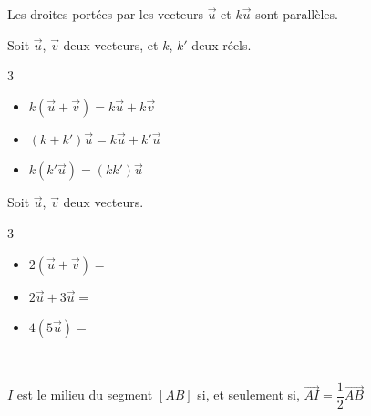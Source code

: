 \begin{Remarque}
Les droites portées par les vecteurs $\overrightarrow{u}$ et $k\overrightarrow{u}$ sont parallèles.
\end{Remarque}



\begin{Propriété}
Soit $\overrightarrow{u}$, $\overrightarrow{v}$ deux vecteurs, et $k$, $k'$ deux réels.
\vspace{-0.5cm}
\begin{multicols}{3}
\begin{itemize}[label=\textcolor{Couleur2}{$\bullet$}]
\item $k(\overrightarrow{u}+\overrightarrow{v})=k\overrightarrow{u}+k\overrightarrow{v}$
\item $(k+k')\overrightarrow{u}=k\overrightarrow{u}+k'\overrightarrow{u}$
\item $k(k'\overrightarrow{u})=(kk')\overrightarrow{u}$
\end{itemize}
\end{multicols}
\end{Propriété}

\begin{Exemple}
Soit $\overrightarrow{u}$, $\overrightarrow{v}$ deux vecteurs.
\vspace{-0.5cm}
\begin{multicols}{3}
\begin{itemize}[label=\textcolor{Couleur8}{$\bullet$}]
\item $2(\overrightarrow{u}+\overrightarrow{v})=$ \ligne
\item $2\overrightarrow{u}+3\overrightarrow{u}=$ \ligne
\item $4(5\overrightarrow{u})=$ \ligne
\end{itemize}
\end{multicols}
\end{Exemple}



\begin{Propriété} $ $\\
\vspace{-0.5cm}
\begin{minipage}[c]{0.6\linewidth}
$I$ est le milieu du segment $[AB]$ si, et seulement si, $\overrightarrow{AI}=\dfrac{1}{2}\overrightarrow{AB}$
\end{minipage} \hfill
\begin{minipage}[c]{0.3\linewidth}
\end{minipage}
\vspace{0.5cm}
\end{Propriété}


